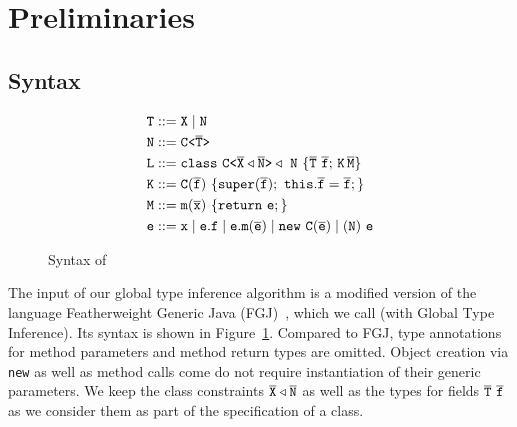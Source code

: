 \section{Preliminaries}
\label{sec:preliminaries}
\subsection{Syntax}
\begin{figure}[tp]
\begin{align*}
  {\tt T} &::= {\tt X} \mid {\tt N} \\
  {\tt N} &::= \mathtt{C \texttt{<} \overline{\tt T} \texttt{>} }\\
  {\tt L} &::= \mathtt{class} \ \mathtt{C \texttt{<} \overline{\tt X} \triangleleft \overline{\tt N} \texttt{>} } \triangleleft \ {\tt N}\ \{ \overline{\tt T} \ \overline{\tt f}; \,{\tt K} \, \overline{\tt M} \} \\
  {\tt K} &::= {\tt C}(\overline{\tt f})\ \{\mathtt{super}(\overline{\tt f}); \ \mathtt{this}.\overline{\tt f}=\overline{\tt f};\} \\
  {\tt M} &::= \mathtt{m}(\overline{\tt x})\ \{ \mathtt{ return}\ {\tt e}; \} \\
  {\tt e} &::= {\tt x} \mid {\tt e}.{\tt f} \mid
             {\tt e}.\mathtt{m}(\overline{\tt e}) \mid \mathtt{new}\ \mathtt{C}(\overline{\tt e})
             \mid ({\tt N})\ {\tt e}
\end{align*}
  \caption{Syntax of \TFGJ}
  \label{fig:syntax-tfgj}
\end{figure}
The input of our global type inference algorithm is a modified version
of the language Featherweight Generic Java
(FGJ)~\cite{DBLP:journals/toplas/IgarashiPW01}, which we call \TFGJ
(with Global Type Inference).
Its syntax is shown in Figure~\ref{fig:syntax-tfgj}.
Compared to FGJ,
type annotations for method parameters and method return types are omitted.
Object creation via \texttt{new} as well as method calls come do not
require instantiation of their generic parameters.
We keep the class constraints ${\overline{\tt X} \triangleleft \overline{\tt N}}$ as well as the types
for fields $\overline{\tt T} \ \overline{\tt f}$ as we consider them as part of the
specification of a class.

